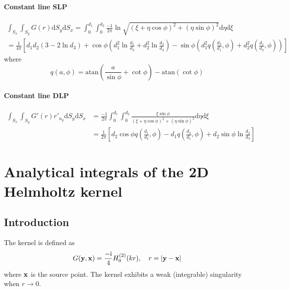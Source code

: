 \documentclass[a4paper,11pt]{article}
\newcommand{\td}{\mathrm{d}}
\newcommand{\ti}{\mathrm{i}}
\newcommand{\atan}{\mathrm{atan}}
\begin{document}
\paragraph{Constant line SLP}

\begin{multline}
\int_{S_{x}} \int_{S_{y}} G(r) \td S_y \td S_x =
\int_{0}^{d_1} \int_{0}^{d_2}
\frac{-1}{2\pi}\ln \sqrt{(\xi+\eta \cos\phi)^2 + (\eta\sin\phi)^2}
\td \eta \td \xi \\
=
\frac{1}{4 \pi}
\left[
d_1 d_2 \left(3 - 2 \ln d_3 \right)
+ \cos\phi \left(d_1^2 \ln \frac{d_1}{d_3} + d_2^2 \ln \frac{d_2}{d_3}\right)
- \sin\phi \left(d_1^2 q\left(\frac{d_2}{d_1}, \phi\right) + d_2^2 q\left(\frac{d_1}{d_2}, \phi\right)\right)
\right]
\end{multline}
%
where
%
\begin{equation}
q(a, \phi) = \atan\left(\frac{a}{\sin\phi} + \cot\phi\right) - \atan\left(\cot\phi\right)
\end{equation}

\paragraph{Constant line DLP}

\begin{align}
\int_{S_{x}} \int_{S_{y}} G'(r) r'_{n_{y}} \td S_y \td S_x
&=
\frac{-1}{2\pi}\int_{0}^{d_1} \int_{0}^{d_2}
\frac{\xi\sin\phi}{(\xi+\eta \cos\phi)^2 + (\eta\sin\phi)^2}
\td \eta \td \xi \nonumber \\
&=
\frac{1}{2\pi}\left[
	d_2 \cos\phi q\left(\frac{d_1}{d_2}, \phi\right)
	- d_1 q\left(\frac{d_2}{d_1}, \phi\right)
	+ d_2 \sin\phi \ln \frac{d_2}{d_3}
\right]
\end{align}



\section {Analytical integrals of the 2D Helmholtz kernel}

\subsection{Introduction}

The kernel is defined as
%
\begin{equation}
	G({\bf y}, {\bf x}) = \frac{-\ti}{4} H_0^{(2)}(kr), \quad r = |{\bf y} - {\bf x}|
\end{equation}
%
where ${\bf x}$ is the source point. The kernel exhibits a weak (integrable) singularity when $r \to 0$.
\end{document}
